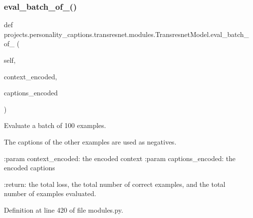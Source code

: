 \subsubsection{\texorpdfstring{eval\+\_\+batch\+\_\+of\+\_()}{eval\_batch\_of\_100()}}
{\footnotesize\ttfamily def projects.\+personality\+\_\+captions.\+transresnet.\+modules.\+Transresnet\+Model.\+eval\+\_\+batch\+\_\+of\+\_ (\begin{DoxyParamCaption}\item[{}]{self,  }\item[{}]{context\+\_\+encoded,  }\item[{}]{captions\+\_\+encoded }\end{DoxyParamCaption})}

\begin{DoxyVerb}Evaluate a batch of 100 examples.

The captions of the other examples are used as negatives.

:param context_encoded:
    the encoded context
:param captions_encoded:
    the encoded captions

:return:
    the total loss, the total number of correct examples, and the
    total number of examples evaluated.
\end{DoxyVerb}
 

Definition at line 420 of file modules.\+py.


